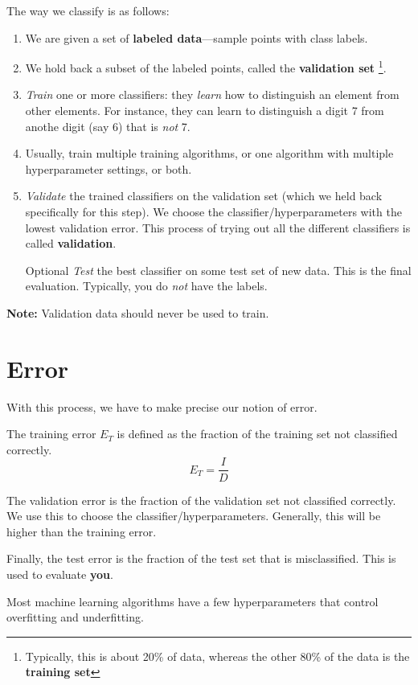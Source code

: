 The way we classify is as follows:
\begin{enumerate}
    \item We are given a set of \textbf{labeled data}---sample points with class labels.
    \item We hold back a subset of the labeled points, called the \textbf{validation set}
    \footnote{Typically, this is about 20\% of data, whereas the other 80\% of the data is the \textbf{training set}}.
    \item \textit{Train} one or more classifiers:
    they \textit{learn} how to distinguish an element from other elements.
    For instance, they can learn to distinguish a digit 7 from anothe digit (say 6) that is \textit{not} 7.
    \item Usually, train multiple training algorithms, or one algorithm with multiple hyperparameter settings, or both.
    \item \textit{Validate} the trained classifiers on the validation set (which we held back specifically for this step).
    We choose the classifier/hyperparameters with the lowest validation error.
    This process of trying out all the different classifiers is called \textbf{validation}.
    \item [Optional] \textit{Test} the best classifier on some test set of new data.
    This is the final evaluation.
    Typically, you do \textit{not} have the labels.
    
\end{enumerate}
\textbf{Note:} Validation data should never be used to train.

\section{Error}
With this process, we have to make precise our notion of error.

The training error $E_T$ is defined as the fraction of the training set not classified correctly.
$$E_{T} = \frac{I}{D}$$

The validation error is the fraction of the validation set not classified correctly.
We use this to choose the classifier/hyperparameters.
Generally, this will be higher than the training error.

Finally, the test error is the fraction of the test set that is misclassified.
This is used to evaluate \textbf{you}.

Most machine learning algorithms have a few hyperparameters that control overfitting and underfitting.

